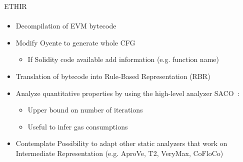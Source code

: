\begin{frame}{ETHIR}
\framesubtitle{\cite{bib:ETHIR}}
    \begin{itemize}
        \item Decompilation of EVM bytecode
        \item Modify Oyente to generate whole CFG
        \begin{itemize}
            \item If Solidity code available add information (e.g. function
            name)
        \end{itemize}
        \item Translation of bytecode into Rule-Based Representation (RBR)
        \item Analyze quantitative properties by using the high-level analyzer
        SACO~\cite{bib:SACO}:
        \begin{itemize}
            \item Upper bound on number of iterations
            \item Useful to infer gas consumptions
        \end{itemize}
        \item Contemplate Possibility to adapt other static analyzers that work
        on Intermediate Representation (e.g. AproVe, T2, VeryMax, CoFloCo)
    \end{itemize}
\end{frame}

